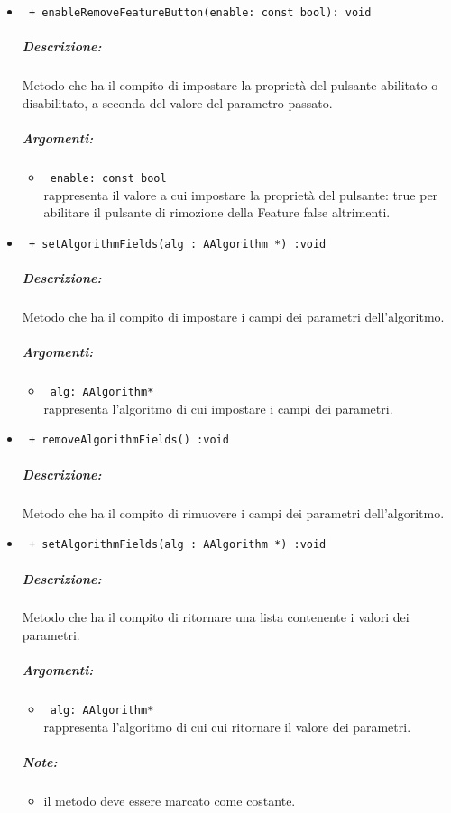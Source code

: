 \begin{itemize}
\item \color{blue} \verb! + enableRemoveFeatureButton(enable: const bool): void!
\color{black}
\subparagraph{Descrizione:} Metodo che ha il compito di impostare la proprietà del pulsante abilitato o disabilitato, a seconda del valore del parametro passato.
\subparagraph{Argomenti:}
\begin{itemize}
\item \color{RoyalPurple} \verb! enable: const bool! \\ rappresenta il valore a cui impostare la proprietà del pulsante: true per abilitare il pulsante di rimozione della Feature\g{} false altrimenti.
\end{itemize}

\item \color{blue} \verb! + setAlgorithmFields(alg : AAlgorithm *) :void! 
\color{black}
\subparagraph{Descrizione:} Metodo che ha il compito di impostare i campi dei parametri dell'algoritmo.
\subparagraph{Argomenti:}
\begin{itemize}
\item \color{RoyalPurple} \verb! alg: AAlgorithm*! \\ rappresenta l'algoritmo di cui impostare i campi dei parametri.
\end{itemize}

\item \color{blue} \verb! + removeAlgorithmFields() :void! 
\color{black}
\subparagraph{Descrizione:} Metodo che ha il compito di rimuovere i campi dei parametri dell'algoritmo.


\item \color{blue} \verb! + setAlgorithmFields(alg : AAlgorithm *) :void! 
\color{black}
\subparagraph{Descrizione:} Metodo che ha il compito di ritornare una lista contenente i valori dei parametri.
\subparagraph{Argomenti:}
\begin{itemize}
\item \color{RoyalPurple} \verb! alg: AAlgorithm*! \\ rappresenta l'algoritmo di cui cui ritornare il valore dei parametri.
\end{itemize}
\subparagraph{Note:}
\begin{itemize}
\item il metodo deve essere marcato come costante.
\end{itemize}


\end{itemize}
